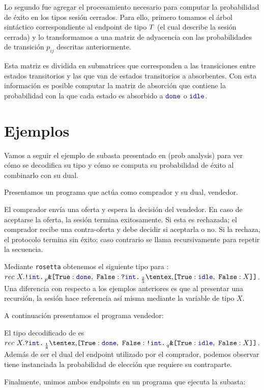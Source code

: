 Lo segundo fue agregar el procesamiento necesario para computar la probabilidad
de éxito en los tipos sesión cerrados. Para ello, primero tomamos el árbol
sintáctico correspondiente al endpoint de tipo $T$ (el cual describe
la sesión cerrada) y lo transformamos a una matriz de adyacencia con las
probabilidades de transición $p_{ij}$ descritas anteriormente.

Esta matriz es dividida en submatrices que corresponden a las transiciones
entre estados transitorios y las que van de estados transitorios a absorbentes.
Con esta información es posible computar la matriz de absorción que contiene la
probabilidad con la que cada estado es absorbido a $\Done$ o $\Idle$.

\section{Ejemplos}

Vamos a seguir el ejemplo de subasta presentado en (prob analysis)  para ver cómo se decodifica su tipo y cómo se computa su
probabilidad de éxito al combinarlo con su dual.

Presentamos un programa que actúa como comprador y su dual, vendedor.

\AuctionBuyer

El comprador envía una oferta y espera la decisión del vendedor. En caso de
aceptarse la oferta, la sesión termina exitosamente. Si esta es rechazada; el
comprador recibe una contra-oferta y debe decidir si aceptarla o no. Si la
rechaza, el protocolo termina sin éxito; caso contrario se llama recursivamente
para repetir la secuencia.

Mediante \texttt{rosetta} obtenemos el siguiente tipo para : $rec\
X.\Out\tint\BinaryPBranch[p]{\Done}{\In\tint\BinaryPChoice[\frac{2}{3}]{\Idle}{X}}$.
Una diferencia con respecto a los ejemplos anteriores es que al presentar una
recursión, la sesión hace referencia así misma mediante la variable de tipo $X$.

A continuación presentamos el programa vendedor:

\AuctionSeller

El tipo decodificado de  es $rec\
X.\In\tint\BinaryPChoice[\frac{1}{4}]{\Done}{\Out\tint\BinaryPBranch[q]{\Idle}{X}}$.
Además de ser el dual del endpoint utilizado por el comprador, podemos observar
tiene instanciada la probabilidad de elección que requiere su contraparte.

Finalmente, unimos ambos endpoints en un programa que ejecuta la subasta:

